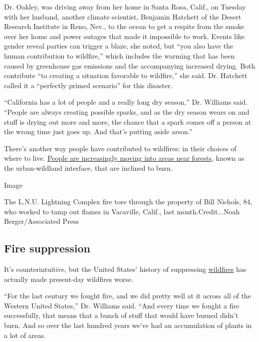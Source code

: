 Dr. Oakley, was driving away from her home in Santa Rosa, Calif., on
Tuesday with her husband, another climate scientist, Benjamin Hatchett
of the Desert Research Institute in Reno, Nev., to the ocean to get a
respite from the smoke over her home and power outages that made it
impossible to work. Events like gender reveal parties can trigger a
blaze, she noted, but ``you also have the human contribution to
wildfire,'' which includes the warming that has been caused by
greenhouse gas emissions and the accompanying increased drying. Both
contribute ``to creating a situation favorable to wildfire,'' she said.
Dr. Hatchett called it a ``perfectly primed scenario'' for this
disaster.

``California has a lot of people and a really long dry season,'' Dr.
Williams said. ``People are always creating possible sparks, and as the
dry season wears on and stuff is drying out more and more, the chance
that a spark comes off a person at the wrong time just goes up. And
that's putting aside arson.''

There's another way people have contributed to wildfires: in their
choices of where to live.
\href{https://www.nytimes3xbfgragh.onion/2018/11/15/climate/california-fires-wildland-urban-interface.html}{People
are increasingly moving into areas near forests}, known as the
urban-wildland interface, that are inclined to burn.

Image

The L.N.U. Lightning Complex fire tore through the property of Bill
Nichols, 84, who worked to tamp out flames in Vacaville, Calif., last
month.Credit...Noah Berger/Associated Press

\hypertarget{fire-suppression}{%
\subsection{Fire suppression}\label{fire-suppression}}

It's counterintuitive, but the United States' history of suppressing
\href{https://www.nytimes3xbfgragh.onion/interactive/2019/03/18/business/pge-california-wildfires.html}{wildfires}
has actually made present-day wildfires worse.

``For the last century we fought fire, and we did pretty well at it
across all of the Western United States,'' Dr. Williams said. ``And
every time we fought a fire successfully, that means that a bunch of
stuff that would have burned didn't burn. And so over the last hundred
years we've had an accumulation of plants in a lot of areas.

